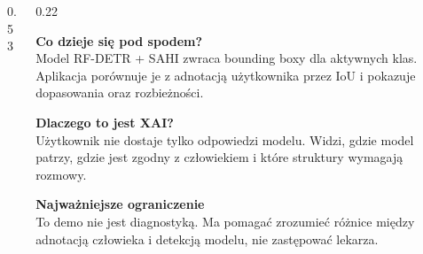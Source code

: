 \documentclass[final]{beamer}
\newcommand{\miniheading}[1]{{\Large\bfseries\color{DarkTeal}#1}}
\begin{document}
\begin{frame}[t]
\begin{columns}[T,totalwidth=\textwidth]
\begin{column}{0.53\textwidth}
\begin{tcolorbox}[softcard,width=\linewidth]
    \end{tcolorbox}
  \end{column}

  \begin{column}{0.22\textwidth}
    \begin{tcolorbox}[softcard,width=\linewidth]
      \miniheading{Co dzieje się pod spodem?}\\[0.4em]
      {\Large
      Model RF-DETR + SAHI zwraca bounding boxy dla aktywnych klas.
      Aplikacja porównuje je z adnotacją użytkownika przez IoU i pokazuje
      dopasowania oraz rozbieżności.}
    \end{tcolorbox}

    \vspace{0.7cm}

    \begin{tcolorbox}[softcard,width=\linewidth]
      \miniheading{Dlaczego to jest XAI?}\\[0.4em]
      {\Large
      Użytkownik nie dostaje tylko odpowiedzi modelu. Widzi, gdzie model patrzy,
      gdzie jest zgodny z człowiekiem i które struktury wymagają rozmowy.}
    \end{tcolorbox}

    \vspace{0.7cm}

    \begin{tcolorbox}[softcard,width=\linewidth]
      \miniheading{Najważniejsze ograniczenie}\\[0.4em]
      {\Large
      To demo nie jest diagnostyką. Ma pomagać zrozumieć różnice między
      adnotacją człowieka i detekcją modelu, nie zastępować lekarza.}
    \end{tcolorbox}
  \end{column}
\end{columns}

\vspace{0.8cm}


\end{frame}
\end{document}
